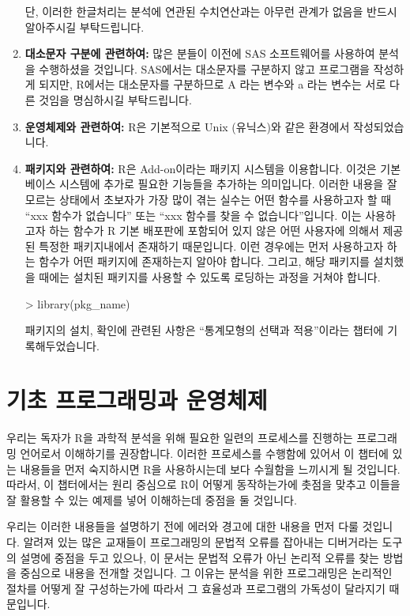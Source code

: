 \documentclass{report}
\begin{document}
\begin{enumerate}
단, 이러한 한글처리는 분석에 연관된 수치연산과는 아무런 관계가 없음을 반드시 알아주시길 부탁드립니다.


	\item \textbf{대소문자 구분에 관련하여:}
많은 분들이 이전에 SAS 소프트웨어를 사용하여 분석을 수행하셨을 것입니다.
SAS에서는 대소문자를 구분하지 않고 프로그램을 작성하게 되지만, R에서는 대소문자를 구분하므로 A 라는 변수와 a 라는 변수는 서로 다른 것임을 명심하시길 부탁드립니다. 


	\item \textbf{운영체제와 관련하여:}
R은 기본적으로 Unix (유닉스)와 같은 환경에서 작성되었습니다. 


	\item \textbf{패키지와 관련하여: }
R은 Add-on이라는 패키지 시스템을 이용합니다. 
이것은 기본 베이스 시스템에 추가로 필요한 기능들을 추가하는 의미입니다.
이러한 내용을 잘 모르는 상태에서 초보자가 가장 많이 겪는 실수는 어떤 함수를 사용하고자 할 때 ``xxx 함수가 없습니다'' 또는 ``xxx 함수를 찾을 수 없습니다''입니다.
이는 사용하고자 하는 함수가 R 기본 배포판에 포함되어 있지 않은 어떤 사용자에 의해서 제공된 특정한 패키지내에서 존재하기 때문입니다.
이런 경우에는 먼저 사용하고자 하는 함수가 어떤 패키지에 존재하는지 알아야 합니다.  
그리고, 해당 패키지를 설치했을 때에는 설치된 패키지를 사용할 수 있도록 로딩하는 과정을 거쳐야 합니다.

\begin{Schunk}
\begin{Soutput}
> library(pkg_name)	
\end{Soutput}
\end{Schunk}

패키지의 설치, 확인에 관련된 사항은 ``통계모형의 선택과 적용''이라는 챕터에 기록해두었습니다. 

\end{enumerate}


\chapter{기초 프로그래밍과 운영체제}

우리는 독자가 R을 과학적 분석을 위해 필요한 일련의 프로세스를 진행하는 프로그래밍 언어로서 이해하기를 권장합니다.
이러한 프로세스를 수행함에 있어서 이 챕터에 있는 내용들을 먼저 숙지하시면 R을 사용하시는데 보다 수월함을 느끼시게 될 것입니다. 
따라서, 이 챕터에서는 원리 중심으로 R이 어떻게 동작하는가에 촛점을 맞추고 이들을 잘 활용할 수 있는 예제를 넣어 이해하는데 중점을 둘 것입니다. 

우리는 이러한 내용들을 설명하기 전에 에러와 경고에 대한 내용을 먼저 다룰 것입니다. 
알려져 있는 많은 교재들이 프로그래밍의 문법적 오류를 잡아내는 디버거라는 도구의 설명에 중점을 두고 있으나, 이 문서는 문법적 오류가 아닌 논리적 오류를 찾는 방법을 중심으로 내용을 전개할 것입니다. 
그 이유는 분석을 위한 프로그래밍은 논리적인 절차를 어떻게 잘 구성하는가에 따라서 그 효율성과 프로그램의 가독성이 달라지기 때문입니다. 
\end{document}
